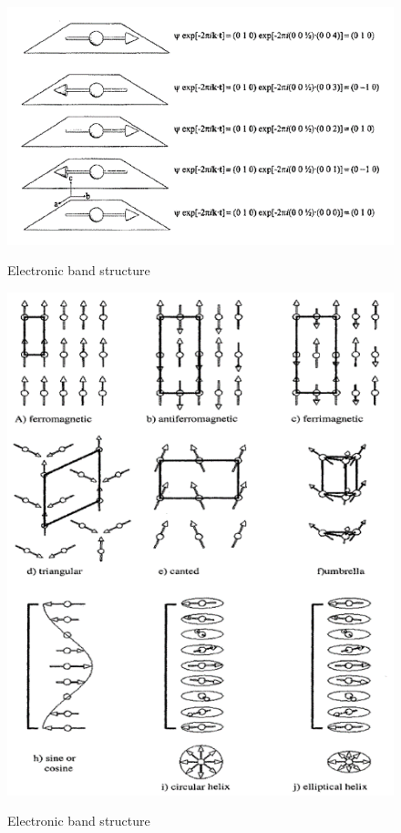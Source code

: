 \documentclass[10pt,doublespacing,edeposit]{uiucthesis2020}
\begin{document}
\begin{mainmatter}
\begin{figure}
\centering\includegraphics[width=\columnwidth]{figures/ch4/propagation_vector.png} \\
\caption{\label{fig:propagation_vector}
Electronic band structure
}
\end{figure}

\begin{figure}
\centering\includegraphics[width=\columnwidth]{figures/ch4/mag_structures_single_k.png} \\
\caption{\label{fig:mag_structures_single_k}
Electronic band structure
}
\end{figure}


\end{mainmatter}
\end{document}
